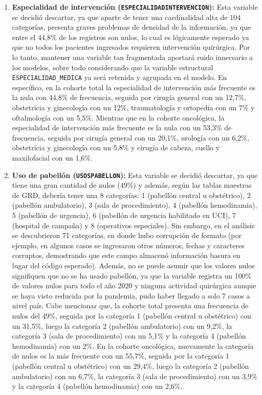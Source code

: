 \begin{enumerate}
    \item \textbf{Especialidad de intervención (\texttt{ESPECIALIDADINTERVENCION}):} Esta variable se decidió descartar, ya que aparte de tener una cardinalidad alta de 104 categorías, presenta graves problemas de densidad de la información, ya que entre el 44,8\% de los registros son nulos, lo cual es lógicamente esperado ya que no todos los pacientes ingresados requieren intervención quirúrgica. Por lo tanto, mantener una variable tan fragmentada aportará ruido innecsario a los modelos, sobre todo considerando que la variable estructural \texttt{ESPECIALIDAD\_MEDICA} ya será retenida y agrupada en el modelo. En específico, en la cohorte total la especialidad de intervención más frecuente es la nula con 44,8\% de frecuencia, seguida por cirugía general con un 12,7\%, obstetricia y ginecología con un 12\%, traumatología y ortopedia con un 7\% y oftalmología con un 5,5\%. Mientras que en la cohorte oncológica, la especialidad de intervención más frecuente es la nula con un 53,3\% de frecuencia, seguida por cirugía general con un 20,1\%, urología con un 6,2\%, obstetricia y ginecología con un 5,8\% y cirugía de cabeza, cuello y maxilofacial con un 1,6\%.
    \item \textbf{Uso de pabellón (\texttt{USOSPABELLON}):} Esta variable se decidió descartar, ya que tiene una gran cantidad de nulos (49\%) y además, según las tablas maestras de GRD, debería tener una 8 categorías: 1 (pabellón central u obstétrico), 2 (pabellón ambulatorio), 3 (sala de procedimiento), 4 (pabellón hemodinamia), 5 (pabellón de urgencia), 6 (pabellón de urgencia habilitado en UCI), 7 (hospital de campaña) y 8 (operativos especiales). Sin embargo, en el análisis se descubrieron 71 categorías, en donde hubo corrupción de formato (por ejemplo, en algunos casos se ingresaron otros números, fechas y caracteres corruptos, demostrando que este campo almacenó información basura en lugar del código esperado). Además, no se puede asumir que los valores nulos signifiquen que no se ha usado pabellón, ya que la variable registra un 100\% de valores nulos para todo el año 2020 y ninguna actividad quirúrgica aunque se haya visto reducida por la pandemia, pudo haber llegado a solo 7 casos a nivel país. Cabe mencionar que, la cohorte total presenta una frecuencia de nulos del 49\%, seguida por la categoría 1 (pabellón central u obstétrico) con un 31,5\%, luego la categoría 2 (pabellón ambulatorio) con un 9,2\%, la categoría 3 (sala de procedimiento) con un 5,1\% y la categoría 4 (pabellón hemodinamia) con un 2\%. En la cohorte oncológica, nuevamente la categoría de nulos es la más frecuente con un 55,7\%, seguida por la categoría 1 (pabellón central u obstétrico) con un 29,4\%, luego la categoría 2 (pabellón ambulatorio) con un 6,7\%, la categoría 3 (sala de procedimiento) con un 3,9\% y la categoría 4 (pabellón hemodinamia) con un 2,6\%.

\end{enumerate}
